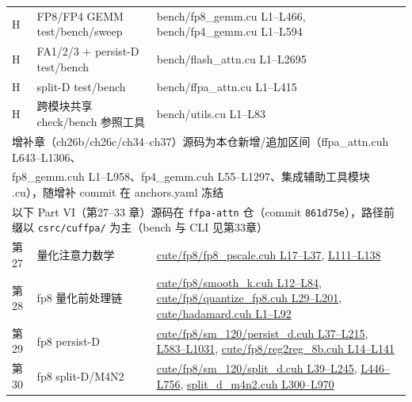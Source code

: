 \begin{longtable}{llp{7.2cm}}
H & FP8/FP4 GEMM test/bench/sweep & bench/fp8\_gemm.cu L1--L466, bench/fp4\_gemm.cu L1--L594 \\
H & FA1/2/3 $+$ persist-D test/bench & bench/flash\_attn.cu L1--L2695 \\
H & split-D test/bench & bench/ffpa\_attn.cu L1--L415 \\
H & 跨模块共享 check/bench 参照工具 & bench/utils.cu L1--L83 \\
\multicolumn{3}{l}{\footnotesize 增补章（ch26b/ch26c/ch34--ch37）源码为本仓新增/追加区间（ffpa\_attn.cuh L643--L1306、} \\
\multicolumn{3}{l}{\footnotesize fp8\_gemm.cuh L1--L958、fp4\_gemm.cuh L55--L1297、集成辅助工具模块 .cu），随增补 commit 在 anchors.yaml 冻结} \\
\multicolumn{3}{l}{\footnotesize 以下 Part VI（第27--33 章）源码在 \texttt{ffpa-attn} 仓（commit \texttt{861d75e}），路径前缀以 \texttt{csrc/cuffpa/} 为主（bench 与 CLI 见第33章）} \\
第27 & 量化注意力数学 & \href{https://github.com/vipshop/ffpa-attn/blob/861d75ee87824a14a9ebfe295d54c7dac3e3cabc/csrc/cuffpa/cute/fp8/fp8_pscale.cuh#L17-L37}{cute/fp8/fp8\_pscale.cuh L17--L37}, \href{https://github.com/vipshop/ffpa-attn/blob/861d75ee87824a14a9ebfe295d54c7dac3e3cabc/csrc/cuffpa/cute/fp8/fp8_pscale.cuh#L111-L138}{L111--L138} \\
第28 & fp8 量化前处理链 & \href{https://github.com/vipshop/ffpa-attn/blob/861d75ee87824a14a9ebfe295d54c7dac3e3cabc/csrc/cuffpa/cute/fp8/smooth_k.cuh#L12-L84}{cute/fp8/smooth\_k.cuh L12--L84}, \href{https://github.com/vipshop/ffpa-attn/blob/861d75ee87824a14a9ebfe295d54c7dac3e3cabc/csrc/cuffpa/cute/fp8/quantize_fp8.cuh#L29-L201}{cute/fp8/quantize\_fp8.cuh L29--L201}, \href{https://github.com/vipshop/ffpa-attn/blob/861d75ee87824a14a9ebfe295d54c7dac3e3cabc/csrc/cuffpa/cute/hadamard.cuh#L1-L92}{cute/hadamard.cuh L1--L92} \\
第29 & fp8 persist-D & \href{https://github.com/vipshop/ffpa-attn/blob/861d75ee87824a14a9ebfe295d54c7dac3e3cabc/csrc/cuffpa/cute/fp8/sm_120/persist_d.cuh#L37-L215}{cute/fp8/sm\_120/persist\_d.cuh L37--L215}, \href{https://github.com/vipshop/ffpa-attn/blob/861d75ee87824a14a9ebfe295d54c7dac3e3cabc/csrc/cuffpa/cute/fp8/sm_120/persist_d.cuh#L583-L1031}{L583--L1031}, \href{https://github.com/vipshop/ffpa-attn/blob/861d75ee87824a14a9ebfe295d54c7dac3e3cabc/csrc/cuffpa/cute/fp8/reg2reg_8b.cuh#L14-L141}{cute/fp8/reg2reg\_8b.cuh L14--L141} \\
第30 & fp8 split-D/M4N2 & \href{https://github.com/vipshop/ffpa-attn/blob/861d75ee87824a14a9ebfe295d54c7dac3e3cabc/csrc/cuffpa/cute/fp8/sm_120/split_d.cuh#L39-L245}{cute/fp8/sm\_120/split\_d.cuh L39--L245}, \href{https://github.com/vipshop/ffpa-attn/blob/861d75ee87824a14a9ebfe295d54c7dac3e3cabc/csrc/cuffpa/cute/fp8/sm_120/split_d.cuh#L446-L756}{L446--L756}, \href{https://github.com/vipshop/ffpa-attn/blob/861d75ee87824a14a9ebfe295d54c7dac3e3cabc/csrc/cuffpa/cute/fp8/sm_120/split_d_m4n2.cuh#L300-L970}{split\_d\_m4n2.cuh L300--L970} \\

\end{longtable}
